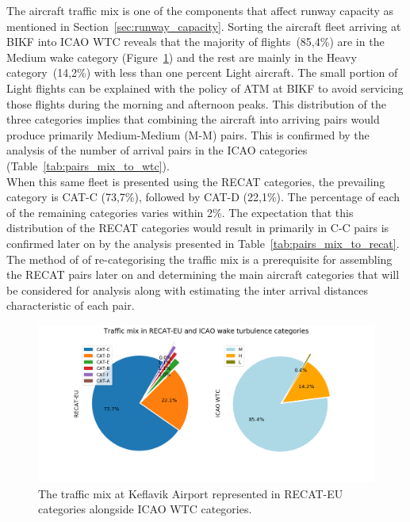 The aircraft traffic mix is one of the components that affect runway capacity as mentioned in Section~\ref{sec:runway_capacity}. Sorting the aircraft fleet arriving at BIKF into ICAO WTC reveals that the majority of flights~(85,4\%) are in the Medium wake category (Figure~\ref{fig:post_fast_exit_mix_pie_v2}) and the rest are mainly in the Heavy category~(14,2\%) with less than one percent Light aircraft. The small portion of Light flights can be explained with the policy of ATM at BIKF to avoid servicing those flights during the morning and afternoon peaks. This distribution of the three categories implies that combining the aircraft into arriving pairs would produce primarily Medium-Medium (M-M) pairs. This is confirmed by the analysis of the number of arrival pairs in the ICAO categories (Table~\ref{tab:pairs_mix_to_wtc}).\\
When this same fleet is presented using the RECAT categories, the prevailing category is CAT-C (73,7\%), followed by CAT-D (22,1\%). The percentage of each of the remaining categories varies within 2\%. The expectation that this distribution of the RECAT categories would result in primarily in C-C pairs is confirmed later on by the analysis presented in Table~\ref{tab:pairs_mix_to_recat}. \\
The method of of re-categorising the traffic mix is a prerequisite for assembling the RECAT pairs later on and determining the main aircraft categories that will be considered for analysis along with estimating the inter arrival distances characteristic of each pair.
\begin{figure}[h]
    \centering
    \includegraphics[width=1\textwidth]{graphics/fig_post_fast_exit_mix_pie_v2.png}
    \caption[Traffic mix in RECAT-EU and ICAO WTC]{The traffic mix at Keflavik Airport represented in RECAT-EU categories alongside ICAO WTC categories.}
    \label{fig:post_fast_exit_mix_pie_v2}
\end{figure}
